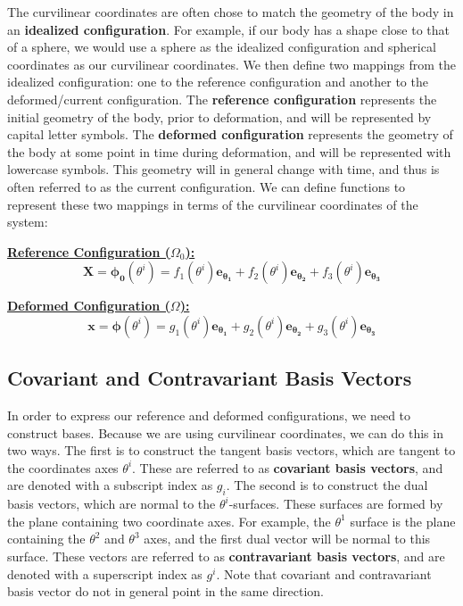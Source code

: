 \documentclass[]{spie}  %
\begin{document}
The curvilinear coordinates are often chose to match the geometry of the body in an \textbf{idealized configuration}. For example, if our body has a shape close to that of a sphere, we would use a sphere as the idealized configuration and spherical coordinates as our curvilinear coordinates. We then define two mappings from the idealized configuration: one to the reference configuration and another to the deformed/current configuration. The \textbf{reference configuration} represents the initial geometry of the body, prior to deformation, and will be represented by capital letter symbols. The \textbf{deformed configuration} represents the geometry of the body at some point in time during deformation, and will be represented with lowercase symbols. This geometry will in general change with time, and thus is often referred to as the current configuration. We can define functions to represent these two mappings in terms of the curvilinear coordinates of the system:

\underline{\textbf{Reference Configuration ($\Omega_0$):}}
\begin{equation}
\bm{X} = \bm{\phi_0}(\theta^i) = f_1(\theta^i)\bm{{e_{\theta_1}}} + f_2(\theta^i)\bm{{e_{\theta_2}}} + f_3(\theta^i)\bm{{e_{\theta_3}}}
\end{equation}

\underline{\textbf{Deformed Configuration ($\Omega$):}}
\begin{equation}
\bm{x} = \bm{\phi}(\theta^i) = g_1(\theta^i)\bm{{e_{\theta_1}}} + g_2(\theta^i)\bm{{e_{\theta_2}}} + g_3(\theta^i)\bm{{e_{\theta_3}}}
\end{equation}

\subsection{Covariant and Contravariant Basis Vectors}

In order to express our reference and deformed configurations, we need to construct bases. Because we are using curvilinear coordinates, we can do this in two ways. The first is to construct the tangent basis vectors, which are tangent to the coordinates axes $\theta^i$. These are referred to as \textbf{covariant basis vectors}, and are denoted with a subscript index as $g_i$. The second is to construct the dual basis vectors, which are normal to the $\theta^i$-surfaces. These surfaces are formed by the plane containing two coordinate axes. For example, the $\theta^1$ surface is the plane containing the $\theta^2$ and $\theta^3$ axes, and the first dual vector will be normal to this surface. These vectors are referred to as \textbf{contravariant basis vectors}, and are denoted with a superscript index as $g^i$. Note that covariant and contravariant basis vector do not in general point in the same direction. 
\end{document}
